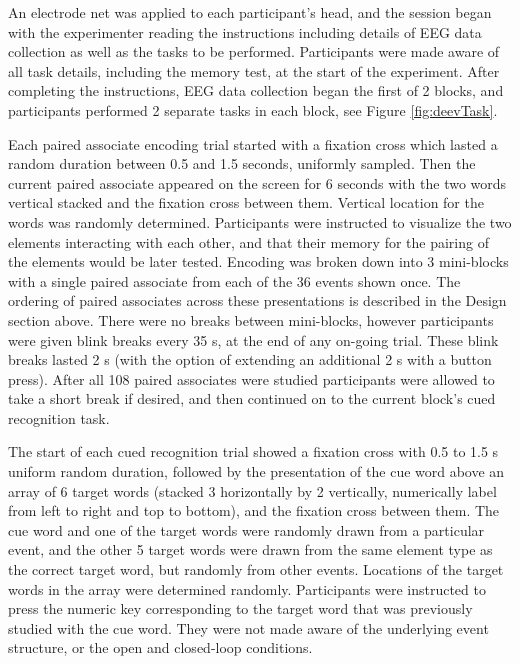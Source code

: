 \documentclass[11pt, titlepage, twoside]{article}
\begin{document}
An electrode net was applied to each participant's head, and the session began with the experimenter reading the instructions including details of EEG data collection as well as the tasks to be performed.  Participants were made aware of all task details, including the memory test, at the start of the experiment.  After completing the instructions, EEG data collection began the first of 2 blocks, and participants performed 2 separate tasks in each block, see Figure \ref{fig:deevTask}. 

Each paired associate encoding trial started with a fixation cross which lasted a random duration between 0.5 and 1.5 seconds, uniformly sampled.  Then the current paired associate appeared on the screen for 6 seconds with the two words vertical stacked and the fixation cross between them. Vertical location for the words was randomly determined.  Participants were instructed to visualize the two elements interacting with each other, and that their memory for the pairing of the elements would be later tested.   Encoding was broken down into 3 mini-blocks with a single paired associate from each of the 36 events shown once.  The ordering of paired associates across these presentations is described in the Design section above.  There were no breaks between mini-blocks, however participants were given blink breaks every 35 s, at the end of any on-going trial.  These blink breaks lasted 2 s (with the option of extending an additional 2 s with a button press).  After all 108 paired associates were studied participants were allowed to take a short break if desired, and then continued on to the current block's cued recognition task.

The start of each cued recognition trial showed a fixation cross with 0.5 to 1.5 s uniform random duration, followed by the presentation of the cue word above an array of 6 target words (stacked 3 horizontally by 2 vertically, numerically label from left to right and top to bottom), and the fixation cross between them.  The cue word and one of the target words were randomly drawn from a particular event, and the other 5 target words were drawn from the same element type as the correct target word, but randomly from other events.  Locations of the target words in the array were determined randomly.  Participants were instructed to press the numeric key corresponding to the target word that was previously studied with the cue word.  They were not made aware of the underlying event structure, or the open and closed-loop conditions.
\end{document}
